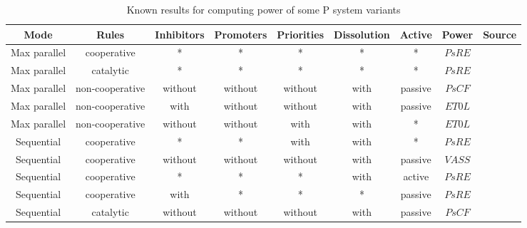\begin{sidewaystable}
  \centering
  \begin{tabular}{|c|c|c|c|c|c|c||c|c|}
    \hline
    Mode & Rules & Inhibitors & Promoters & Priorities & Dissolution & Active & Power & Source \\ \hline
    Max parallel & cooperative & * & * & * & * & * & $PsRE$ & \cite{Paun98} \\ \hline
    Max parallel & catalytic & * & * & * & * & * & $PsRE$ & \cite{Paun98} \\ \hline
    Max parallel & non-cooperative & without & without & without & with & passive & $PsCF$ & \cite{Sburlan05dragos} \\ \hline
    Max parallel & non-cooperative & with & without & without & with & passive & $ET0L$ & \cite{Sburlan:2006:FurtherResultsPromotersInhibitors} \\ \hline
    Max parallel & non-cooperative & without & without & with & with & * & $ET0L$ & \cite{Sburlan05Priorities} \\ \hline
    Sequential & cooperative & * & * & with & with & * & $PsRE$ & \cite{Ibarra05Active} \\ \hline
    Sequential & cooperative & without & without & without & with & passive & $VASS$ & \cite{Ibarra05Active} \\ \hline
    Sequential & cooperative & * & * & * & with & active & $PsRE$ & \cite{Ibarra05Active} \\ \hline
    Sequential & cooperative & with & * & * & * & passive & $PsRE$ & \cite{Kovac14Inhibitors} \\ \hline
    Sequential & catalytic & without & without & without & with & passive & $PsCF$ & \cite{Ibarra04dang} \\ \hline
  \end{tabular}
  \caption{Known results for computing power of some P system variants}
  \label{table:known_results_for_computing_power}
\end{sidewaystable}

\FloatBarrier

